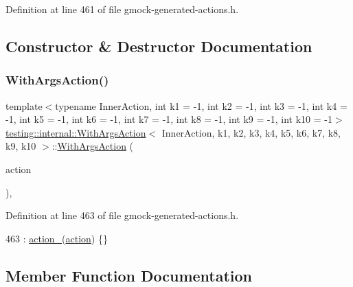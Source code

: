 Definition at line 461 of file gmock-\/generated-\/actions.\+h.



\subsection{Constructor \& Destructor Documentation}
\mbox{\label{classtesting_1_1internal_1_1WithArgsAction_ab408f9c56c8f25564ef554b984e1c926}} 
\subsubsection{\texorpdfstring{With\+Args\+Action()}{WithArgsAction()}}
{\footnotesize\ttfamily template$<$typename Inner\+Action, int k1 = -\/1, int k2 = -\/1, int k3 = -\/1, int k4 = -\/1, int k5 = -\/1, int k6 = -\/1, int k7 = -\/1, int k8 = -\/1, int k9 = -\/1, int k10 = -\/1$>$ \\
\hyperlink{classtesting_1_1internal_1_1WithArgsAction}{testing\+::internal\+::\+With\+Args\+Action}$<$ Inner\+Action, k1, k2, k3, k4, k5, k6, k7, k8, k9, k10 $>$\+::\hyperlink{classtesting_1_1internal_1_1WithArgsAction}{With\+Args\+Action} (\begin{DoxyParamCaption}\item[{const Inner\+Action \&}]{action }\end{DoxyParamCaption})\hspace{0.3cm}{\ttfamily [inline]}, {\ttfamily [explicit]}}



Definition at line 463 of file gmock-\/generated-\/actions.\+h.


\begin{DoxyCode}
463 : \hyperlink{classtesting_1_1internal_1_1WithArgsAction_a2afd51ea9f4b1c73e1dd7035b4dbee27}{action\_}(\hyperlink{namespaceupload_a675d13c979f1c720866d22ed1736f580}{action}) \{\}
\end{DoxyCode}


\subsection{Member Function Documentation}
\mbox{\label{classtesting_1_1internal_1_1WithArgsAction_a18d435ae27f0b4b00a333a74bde746dd}} 
